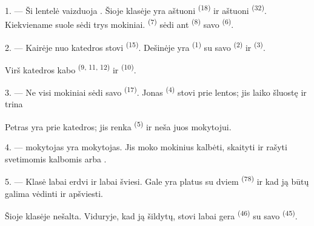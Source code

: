 \VUsaut{2.0mm}
\VUsaut{3.2mm}
\VUsaut{2.6mm}
\VUsaut{3.4mm}
\VUornamento{9pt}
\VUsaut{5.0mm}
\VUsaut{3.0mm}
\VUfilet{16mm}
\VUsaut{5.6mm}

\VUsaut{1.4mm}
\VUsaut{2.2mm}
\VUfilet{20mm}
\VUsaut{6.4mm}

\VUsaut{3.0mm}

1. --- Ši lentelė vaizduoja  . Šioje klasėje yra
aštuoni  \textsuperscript{(18)} ir aštuoni 
\textsuperscript{(32)}. Kiekviename suole sėdi trys mokiniai. 
\textsuperscript{(7)} sėdi ant  \textsuperscript{(8)} savo
 \textsuperscript{(6)}.

2. --- Kairėje nuo katedros stovi  \textsuperscript{(15)}.
Dešinėje yra  \textsuperscript{(1)} su savo 
\textsuperscript{(2)} ir  \textsuperscript{(3)}.

Virš katedros kabo  \textsuperscript{(9, 11, 12)} ir
 \textsuperscript{(10)}.

3. --- Ne visi mokiniai sėdi savo  \textsuperscript{(17)}. Jonas
\textsuperscript{(4)} stovi prie lentos; jis laiko  šluostę ir trina

Petras yra prie katedros; jis renka  \textsuperscript{(5)} ir
neša juos mokytojui.

4. ---  mokytojas yra  mokytojas. Jis moko mokinius
kalbėti, skaityti ir rašyti svetimomis kalbomis  arba .

5. --- Klasė labai erdvi ir labai šviesi. Gale yra platus  su dviem
 \textsuperscript{(78)} ir  kad ją būtų
galima vėdinti ir apšviesti.

Šioje klasėje nešalta. Viduryje, kad ją šildytų, stovi labai gera 
\textsuperscript{(46)} su savo  \textsuperscript{(45)}.


